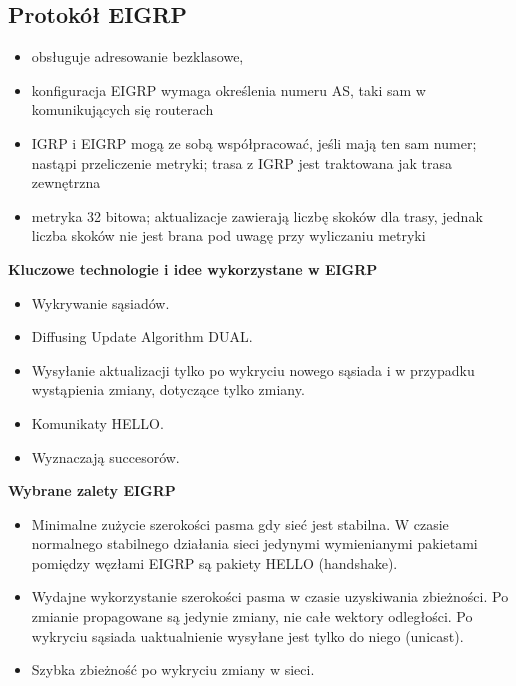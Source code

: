 \documentclass[../main.tex]{subfiles}
\begin{document}
    \subsection{Protokół EIGRP}
    \begin{itemize}
        \item obsługuje adresowanie bezklasowe,
        \item konfiguracja EIGRP wymaga określenia numeru AS, taki sam w komunikujących
        się routerach
        \item IGRP i EIGRP mogą ze sobą współpracować, jeśli mają ten sam numer; nastąpi przeliczenie metryki;
        trasa z IGRP jest traktowana jak trasa zewnętrzna
        \item metryka 32 bitowa; aktualizacje zawierają liczbę skoków dla
        trasy, jednak liczba skoków nie jest brana pod uwagę przy wyliczaniu metryki
    \end{itemize}


    \textbf{Kluczowe technologie i idee wykorzystane w EIGRP}
    \begin{itemize}
        \item Wykrywanie sąsiadów.
        \item Diffusing Update Algorithm DUAL.
        \item Wysyłanie aktualizacji tylko po wykryciu nowego sąsiada i w przypadku wystąpienia
        zmiany, dotyczące tylko zmiany.
        \item Komunikaty HELLO.
        \item Wyznaczają succesorów.
    \end{itemize}

    \textbf{Wybrane zalety EIGRP}
    \begin{itemize}
        \item Minimalne zużycie szerokości pasma gdy sieć jest stabilna. W czasie normalnego
        stabilnego działania sieci jedynymi wymienianymi pakietami pomiędzy węzłami EIGRP są
        pakiety HELLO (handshake).
        \item Wydajne wykorzystanie szerokości pasma w czasie uzyskiwania zbieżności. Po zmianie
        propagowane są jedynie zmiany, nie całe wektory odległości. Po wykryciu sąsiada
        uaktualnienie wysyłane jest tylko do niego (unicast).
        \item Szybka zbieżność po wykryciu zmiany w sieci.
    \end{itemize}
\end{document}
